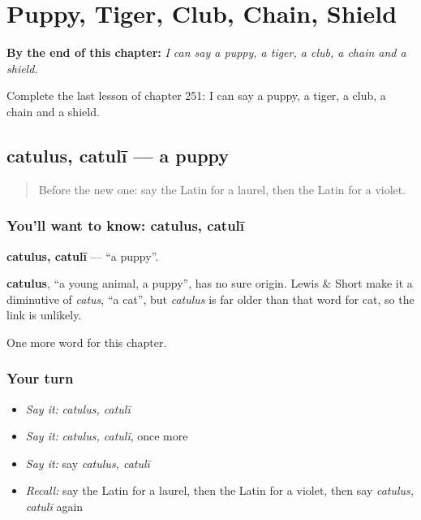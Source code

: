 
\chapter{Puppy, Tiger, Club, Chain, Shield}
\label{ch:la-puppy-tiger-club-chain-shield}

\begin{chapteropening}
\textbf{By the end of this chapter:} \emph{I can say a puppy, a tiger, a club, a chain and a shield.}

Complete the last lesson of chapter 251: I can say a puppy, a tiger, a club, a chain and a shield.
\end{chapteropening}

\section[catulus, catulī]{catulus, catulī — a puppy}

\label{lesson:LA-C251-catulus}



\begin{quote}
Before the new one: say the Latin for a laurel, then the Latin for a violet.
\end{quote}

\subsection*{You'll want to know: catulus, catulī}
\textbf{catulus, catulī} — \textquotedblleft{}a puppy\textquotedblright{}.

\begin{cousinweb}
\textbf{catulus}, \textquotedblleft{}a young animal, a puppy\textquotedblright{}, has no sure origin. Lewis \& Short make it a diminutive of \emph{catus}, \textquotedblleft{}a cat\textquotedblright{}, but \emph{catulus} is far older than that word for cat, so the link is unlikely.
\end{cousinweb}

\begin{grammarlens}[title={What you've built}]
One more word for this chapter.
\end{grammarlens}

\subsection*{Your turn}
\begin{itemize}
\raggedright
  \item \emph{Say it:} \emph{catulus, catulī}
  \item \emph{Say it:} \emph{catulus, catulī}, once more
  \item \emph{Say it:} say \emph{catulus, catulī}
  \item \emph{Recall:} say the Latin for a laurel, then the Latin for a violet, then say \emph{catulus, catulī} again
\end{itemize}


